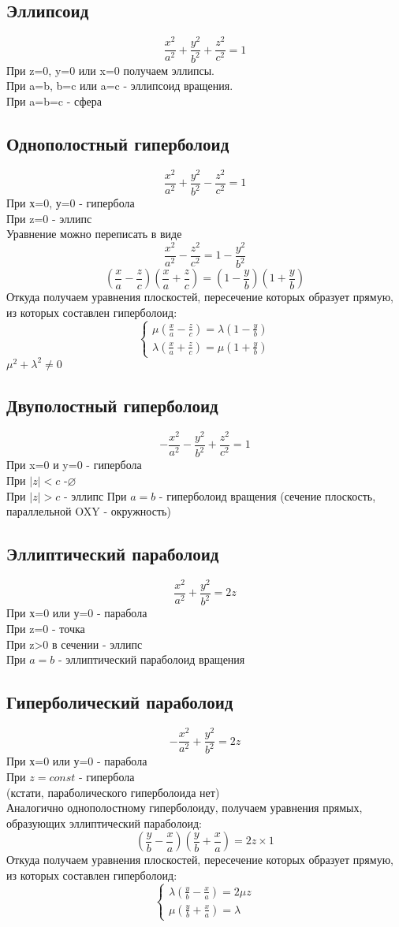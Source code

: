 \subsection{Эллипсоид}
$$\frac{x^2}{a^2}+\frac{y^2}{b^2}+\frac{z^2}{c^2}=1$$
При z=0, y=0 или x=0 получаем эллипсы.\\
При a=b, b=c или a=c - эллипсоид вращения.\\
При a=b=c - сфера
\subsection{Однополостный гиперболоид}
$$\frac{x^2}{a^2}+\frac{y^2}{b^2}-\frac{z^2}{c^2}=1$$
При х=0, у=0 - гипербола\\
При z=0 - эллипс\\
Уравнение можно переписать в виде 
$$\frac{x^2}{a^2}-\frac{z^2}{c^2}=1-\frac{y^2}{b^2}$$
$$\left(\frac{x}{a}-\frac{z}{c}\right)\left(\frac{x}{a}+\frac{z}{c}\right)=
\left(1-\frac{y}{b}\right)\left(1+\frac{y}{b}\right)$$
Откуда получаем уравнения плоскостей, пересечение которых образует прямую,
из которых составлен гиперболоид:
$$ \begin{cases}
\mu(\frac{x}{a}-\frac{z}{c})=\lambda(1-\frac{y}{b})\\
\lambda(\frac{x}{a}+\frac{z}{c})=\mu(1+\frac{y}{b})
\end{cases}$$
$\mu^2+\lambda^2\ne0$
\subsection{Двуполостный гиперболоид}
$$-\frac{x^2}{a^2}-\frac{y^2}{b^2}+\frac{z^2}{c^2}=1$$
При x=0 и y=0 - гипербола\\
При $|z|<c$ -$\varnothing$\\
При $|z|>c$ - эллипс
При $a=b$ - гиперболоид вращения 
(сечение плоскость, параллельной OXY - окружность)
\subsection{Эллиптический параболоид}
$$\frac{x^2}{a^2}+\frac{y^2}{b^2}=2z$$
При х=0 или у=0 - парабола\\
При z=0 - точка\\
При z>0 в сечении - эллипс\\
При $a=b$ - эллиптический параболоид вращения
\subsection{Гиперболический параболоид}
$$-\frac{x^2}{a^2}+\frac{y^2}{b^2}=2z$$
При х=0 или у=0 - парабола\\
При $z=const$ - гипербола\\
(кстати, параболического гиперболоида нет)\\
Аналогично однополостному гиперболоиду, получаем уравнения прямых, 
образующих эллиптический параболоид:
$$\left(\frac{y}{b}-\frac{x}{a}\right)\left(\frac{y}{b}+\frac{x}{a}\right)=
2z\times1$$
Откуда получаем уравнения плоскостей, пересечение которых образует 
прямую, из которых составлен гиперболоид:
$$ \begin{cases}
\lambda(\frac{y}{b}-\frac{x}{a})=2\mu z\\
\mu(\frac{y}{b}+\frac{x}{a})=\lambda
\end{cases}$$
